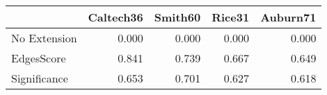 \begin{tabular}{lrrrr}
\toprule
{} & Caltech36 & Smith60 & Rice31 & Auburn71 \\
\midrule
No Extension &     0.000 &   0.000 &  0.000 &    0.000 \\
EdgesScore   &     0.841 &   0.739 &  0.667 &    0.649 \\
Significance &     0.653 &   0.701 &  0.627 &    0.618 \\
\bottomrule
\end{tabular}
